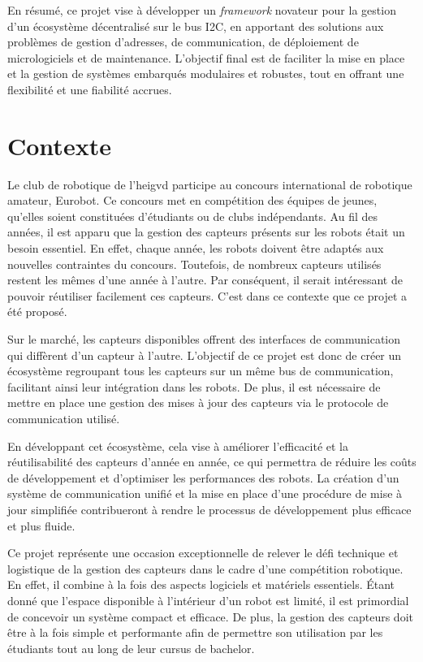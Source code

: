En résumé, ce projet vise à développer un \textit{\gls{framework}} novateur pour la gestion d'un écosystème décentralisé sur le bus I2C, en apportant des solutions aux problèmes de gestion d'adresses, de communication, de déploiement de micrologiciels et de maintenance.
L'objectif final est de faciliter la mise en place et la gestion de systèmes embarqués modulaires et robustes, tout en offrant une flexibilité et une fiabilité accrues.

\section{Contexte}
Le club de robotique de l'\gls{heigvd} participe au concours international de robotique amateur, Eurobot.
Ce concours met en compétition des équipes de jeunes, qu'elles soient constituées d'étudiants ou de clubs indépendants.
Au fil des années, il est apparu que la gestion des capteurs présents sur les robots était un besoin essentiel.
En effet, chaque année, les robots doivent être adaptés aux nouvelles contraintes du concours.
Toutefois, de nombreux capteurs utilisés restent les mêmes d'une année à l'autre.
Par conséquent, il serait intéressant de pouvoir réutiliser facilement ces capteurs.
C'est dans ce contexte que ce projet a été proposé.

Sur le marché, les capteurs disponibles offrent des interfaces de communication qui diffèrent d'un capteur à l'autre.
L'objectif de ce projet est donc de créer un écosystème regroupant tous les capteurs sur un même bus de communication, facilitant ainsi leur intégration dans les robots.
De plus, il est nécessaire de mettre en place une gestion des mises à jour des capteurs via le protocole de communication utilisé.

En développant cet écosystème, cela vise à améliorer l'efficacité et la réutilisabilité des capteurs d'année en année, ce qui permettra de réduire les coûts de développement et d'optimiser les performances des robots.
La création d'un système de communication unifié et la mise en place d'une procédure de mise à jour simplifiée contribueront à rendre le processus de développement plus efficace et plus fluide.

Ce projet représente une occasion exceptionnelle de relever le défi technique et logistique de la gestion des capteurs dans le cadre d'une compétition robotique.
En effet, il combine à la fois des aspects logiciels et matériels essentiels.
Étant donné que l'espace disponible à l'intérieur d'un robot est limité, il est primordial de concevoir un système compact et efficace.
De plus, la gestion des capteurs doit être à la fois simple et performante afin de permettre son utilisation par les étudiants tout au long de leur cursus de bachelor.